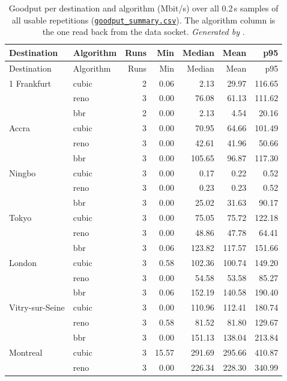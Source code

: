 \documentclass[10pt]{article}
\newcommand{\repo}{https://github.com/philwisniewski/cs-422-assignment-2}
\newcommand{\commit}{d1408ba303b1e3132ba5504e32ebf2ed3572d4e0}
\newcommand{\src}[4]{\href{\repo/blob/\commit/#1\#L#2-L#3}{\texttt{\detokenize{#4}}}}
\newcommand{\resurl}{\repo/tree/\commit/results/20261022-222609}
\newcommand{\gen}[4]{\emph{Generated by} \src{#1}{#2}{#3}{#4}}
\begin{document}
\begin{center}\small
\begin{longtable}{@{}llrrrrr@{}}
\caption{Goodput per destination and algorithm (Mbit/s) over all 0.2\,s samples of all usable repetitions (\href{\resurl/tables/goodput_summary.csv}{\texttt{goodput\_summary.csv}}). The algorithm column is the one read back from the data socket. \gen{analysis.py}{204}{265}{build_tables}.}\label{tab:q1}\\
\toprule
Destination & Algorithm & Runs & Min & Median & Mean & p95 \\
\midrule
\endfirsthead
\toprule
Destination & Algorithm & Runs & Min & Median & Mean & p95 \\
\midrule
\endhead
1 Frankfurt & cubic & 2 & 0.06 & 2.13 & 29.97 & 116.65 \\
 & reno & 3 & 0.00 & 76.08 & 61.13 & 111.62 \\
 & bbr & 2 & 0.00 & 2.13 & 4.54 & 20.16 \\
\addlinespace[2pt]
2 Accra & cubic & 3 & 0.00 & 70.95 & 64.66 & 101.49 \\
 & reno & 3 & 0.00 & 42.61 & 41.96 & 50.66 \\
 & bbr & 3 & 0.00 & 105.65 & 96.87 & 117.30 \\
\addlinespace[2pt]
3 Ningbo & cubic & 3 & 0.00 & 0.17 & 0.22 & 0.52 \\
 & reno & 3 & 0.00 & 0.23 & 0.23 & 0.52 \\
 & bbr & 3 & 0.00 & 25.02 & 31.63 & 90.17 \\
\addlinespace[2pt]
4 Tokyo & cubic & 3 & 0.00 & 75.05 & 75.72 & 122.18 \\
 & reno & 3 & 0.00 & 48.86 & 47.78 & 64.41 \\
 & bbr & 3 & 0.06 & 123.82 & 117.57 & 151.66 \\
\addlinespace[2pt]
5 London & cubic & 3 & 0.58 & 102.36 & 100.74 & 149.20 \\
 & reno & 3 & 0.00 & 54.58 & 53.58 & 85.27 \\
 & bbr & 3 & 0.06 & 152.19 & 140.58 & 190.40 \\
\addlinespace[2pt]
6 Vitry-sur-Seine & cubic & 3 & 0.00 & 110.96 & 112.41 & 180.74 \\
 & reno & 3 & 0.58 & 81.52 & 81.80 & 129.67 \\
 & bbr & 3 & 0.00 & 151.13 & 138.04 & 213.84 \\
\addlinespace[2pt]
7 Montreal & cubic & 3 & 15.57 & 291.69 & 295.66 & 410.87 \\
 & reno & 3 & 0.00 & 226.34 & 228.30 & 340.99 \\

\end{longtable}
\end{center}
\end{document}
